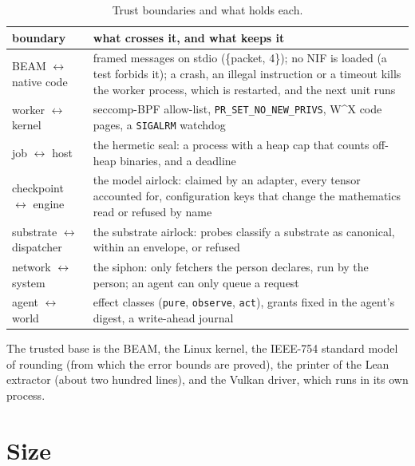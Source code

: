 \begin{table}[h]
\centering\small
\begin{tabularx}{\textwidth}{@{}lX@{}}
\toprule
boundary & what crosses it, and what keeps it \\
\midrule
BEAM $\leftrightarrow$ native code & framed messages on stdio ({\ttfamily\{packet, 4\}}); no NIF is loaded (a test forbids it); a crash, an illegal instruction or a timeout kills the worker process, which is restarted, and the next unit runs \\
worker $\leftrightarrow$ kernel & seccomp-BPF allow-list, \texttt{PR\_SET\_NO\_NEW\_PRIVS}, W\^{}X code pages, a \texttt{SIGALRM} watchdog \\
job $\leftrightarrow$ host & the hermetic seal: a process with a heap cap that counts off-heap binaries, and a deadline \\
checkpoint $\leftrightarrow$ engine & the model airlock: claimed by an adapter, every tensor accounted for, configuration keys that change the mathematics read or refused by name \\
substrate $\leftrightarrow$ dispatcher & the substrate airlock: probes classify a substrate as canonical, within an envelope, or refused \\
network $\leftrightarrow$ system & the siphon: only fetchers the person declares, run by the person; an agent can only queue a request \\
agent $\leftrightarrow$ world & effect classes (\texttt{pure}, \texttt{observe}, \texttt{act}), grants fixed in the agent's digest, a write-ahead journal \\
\bottomrule
\end{tabularx}
\caption{Trust boundaries and what holds each.}
\end{table}

The trusted base is the BEAM, the Linux kernel, the IEEE-754 standard model of rounding (from which the
error bounds are proved), the printer of the Lean extractor (about two hundred lines), and the Vulkan
driver, which runs in its own process.

\section{Size}


